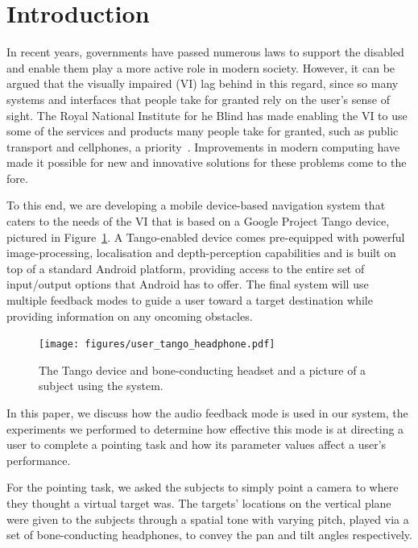 \documentclass[format=sigconf, review=true, screen=true, anonymous=true]{acmart}
\begin{document}
\maketitle

\section{Introduction}

In recent years, governments have passed numerous laws to support the disabled and enable them play a more active role in modern society. However, it can be argued that the visually impaired (VI) lag behind in this regard, since so many systems and interfaces that people take for granted rely on the user's sense of sight. The Royal National Institute for he Blind has made enabling the VI to use some of the services and products many people take for granted, such as public transport and cellphones, a priority~\cite{rnib-objectives}. Improvements in modern computing have made it possible for new and innovative solutions for these problems come to the fore.

To this end, we are developing a mobile device-based navigation system that caters to the needs of the VI that is based on a Google Project Tango device, pictured in Figure~\ref{fig:tango}. A Tango-enabled device comes pre-equipped with powerful image-processing, localisation and depth-perception capabilities and is built on top of a standard Android platform, providing access to the entire set of input/output options that Android has to offer. The final system will use multiple feedback modes to guide a user toward a target destination while providing information on any oncoming obstacles.

\begin{figure}
  \centering
  \texttt{[image: figures/user\_tango\_headphone.pdf]}
  \caption{The Tango device and bone-conducting headset and a picture of a subject using the system. }
  \label{fig:tango}
\end{figure}

In this paper, we discuss how the audio feedback mode is used in our system, the experiments we performed to determine how effective this mode is at directing a user to complete a pointing task and how its parameter values affect a user's performance. 

For the pointing task, we asked the subjects to simply point a camera to where they thought a virtual target was. The targets' locations on the vertical plane were given to the subjects through a spatial tone with varying pitch, played via a set of bone-conducting headphones, to convey the pan and tilt angles respectively. 
\end{document}
